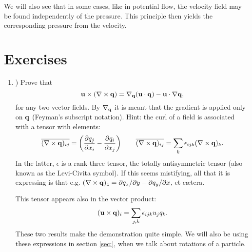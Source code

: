 We will also see that in some cases, like in potential flow, the
velocity field may be found independently of the pressure. This
principle then yields the corresponding pressure from the velocity.


\section{Exercises}

\begin{enumerate}
\item \label{ex:vector_identity}) Prove that
\[
\mathbf{u} \times ( \nabla\times \mathbf{q}) =
\nabla_{\mathbf{q}} (\mathbf{u}\cdot\mathbf{q}) - \mathbf{u} \cdot \nabla \mathbf{q} ,
\]
for any two vector fields. By $\nabla_{\mathbf{q}} $ it is meant that the
gradient is applied only on $\mathbf{q}$ (Feyman's subscript notation).
Hint: the curl of a field is associated with a tensor with elements:
\[
\overline{( \nabla\times\mathbf{q} )_{ij}} =
\left(
\frac{\partial q_j}{\partial x_i} -
\frac{\partial q_i}{\partial x_j}
\right) \qquad
\overline{( \nabla\times\mathbf{q} )_{ij}} =
\sum_k \epsilon_{ijk}  ( \nabla\times\mathbf{q} )_k .
\]
In the latter, $\epsilon$ is a rank-three tensor, the totally
antisymmetric tensor (also known as the Levi-Civita symbol).  If this
seems mistifying, all that it is expressing is that e.g.  $
(\nabla\times\mathbf{q})_z= \partial q_x /\partial y - \partial q_y
/\partial x$, et c\ae tera.

This tensor appears also in the vector product:
\[
(\mathbf{u}\times\mathbf{q})_i= \sum_{j,k} \epsilon_{ijk} u_j q_k .
\]
These two results make the demonstration quite simple. We will
also be using these expressions in section \ref{sec:}, when
we talk about rotations of a particle.

\end{enumerate}
